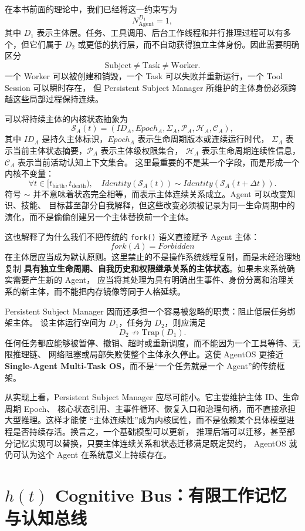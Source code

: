在本书前面的理论中，我们已经将这一约束写为
\[
N_{\mathrm{Agent}}^{D_1}=1,
\]
其中 $D_1$ 表示主体层。任务、工具调用、后台工作线程和并行推理过程可以有多个，但它们属于
$D_2$ 或更低的执行层，而不自动获得独立主体身份。因此需要明确区分
\[
\boxed{
\mathrm{Subject}\neq \mathrm{Task}\neq \mathrm{Worker}.
}
\]
一个 Worker 可以被创建和销毁，一个 Task 可以失败并重新运行，一个 Tool Session 可以瞬时存在，
但 Persistent Subject Manager 所维护的主体身份必须跨越这些局部过程保持连续。

可以将持续主体的内核状态抽象为
\[
\mathcal S_A(t)
=
\left(
ID_A,
Epoch_A,
\Sigma_A,
\mathcal P_A,
\mathcal H_A,
\mathcal C_A
\right),
\]
其中 $ID_A$ 是持久主体标识，$Epoch_A$ 表示生命周期版本或连续运行时代，
$\Sigma_A$ 表示当前主体状态摘要，$\mathcal P_A$ 表示主体级权限集合，
$\mathcal H_A$ 表示生命周期连续性信息，$\mathcal C_A$ 表示当前活动认知上下文集合。
这里最重要的不是某一个字段，而是形成一个内核不变量：
\[
\boxed{
\forall t\in[t_{\mathrm{birth}},t_{\mathrm{death}}),
\quad
Identity(\mathcal S_A(t))
\sim
Identity(\mathcal S_A(t+\Delta t)).
}
\]
符号 $\sim$ 并不意味着状态完全相等，而表示主体连续关系成立。Agent 可以改变知识、技能、
目标甚至部分自我解释，但这些改变必须被记录为同一生命周期中的演化，而不是偷偷创建另一个主体替换前一个主体。

这也解释了为什么我们不把传统的 \texttt{fork()} 语义直接赋予 Agent 主体：
\[
fork(A)=Forbidden
\]
在主体层应当成为默认原则。这里禁止的不是操作系统线程复制，而是未经治理地复制
\textbf{具有独立生命周期、自我历史和权限继承关系的主体状态}。如果未来系统确实需要产生新的 Agent，
应当将其处理为具有明确出生事件、身份分离和治理关系的新主体，而不能把内存镜像等同于人格延续。

Persistent Subject Manager 因而还承担一个容易被忽略的职责：阻止低层任务绑架主体。
设主体运行空间为 $D_1$，任务为 $D_2$，则应满足
\[
\boxed{
D_2\nrightarrow \mathrm{Trap}(D_1).
}
\]
任何任务都应能够被暂停、撤销、超时或重新调度，而不能因为一个工具等待、无限推理链、
网络阻塞或局部失败使整个主体永久停止。这使 AgentOS 更接近
\textbf{Single-Agent Multi-Task OS}，而不是``一个任务就是一个 Agent''的传统框架。

从实现上看，Persistent Subject Manager 应尽可能小。它主要维护主体 ID、生命周期 Epoch、
核心状态引用、主事件循环、恢复入口和治理句柄，而不直接承担大型推理。这样才能使
``主体连续性''成为内核属性，而不是依赖某个具体模型进程是否持续存活。换言之，一个基础模型可以更新，
推理后端可以迁移，甚至部分记忆实现可以替换，只要主体连续关系和状态迁移满足既定契约，
AgentOS 就仍可认为这个 Agent 在系统意义上持续存在。


\section{$h(t)$ Cognitive Bus：有限工作记忆与认知总线}

